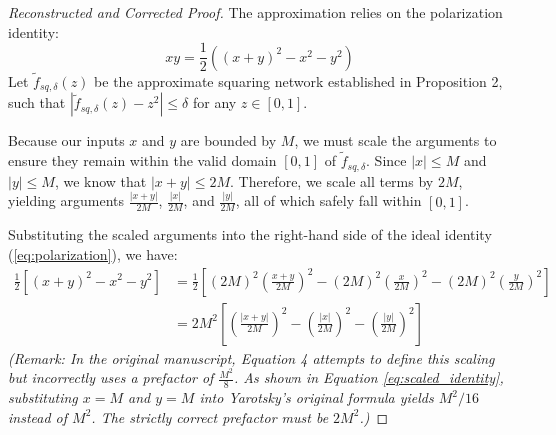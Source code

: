 \documentclass[12pt]{article}
\begin{document}
\begin{proof}[Reconstructed and Corrected Proof]
The approximation relies on the polarization identity:
\begin{equation}
xy = \frac{1}{2} \left( (x+y)^2 - x^2 - y^2 \right) \label{eq:polarization}
\end{equation}
Let $\tilde{f}_{sq, \delta}(z)$ be the approximate squaring network established in Proposition 2, such that $|\tilde{f}_{sq, \delta}(z) - z^2| \le \delta$ for any $z \in [0,1]$. 

Because our inputs $x$ and $y$ are bounded by $M$, we must scale the arguments to ensure they remain within the valid domain $[0,1]$ of $\tilde{f}_{sq, \delta}$. Since $|x| \le M$ and $|y| \le M$, we know that $|x+y| \le 2M$. Therefore, we scale all terms by $2M$, yielding arguments $\frac{|x+y|}{2M}$, $\frac{|x|}{2M}$, and $\frac{|y|}{2M}$, all of which safely fall within $[0,1]$.

Substituting the scaled arguments into the right-hand side of the ideal identity (\ref{eq:polarization}), we have:
\begin{align}
\frac{1}{2} \left[ (x+y)^2 - x^2 - y^2 \right] &= \frac{1}{2} \left[ (2M)^2 \left(\frac{x+y}{2M}\right)^2 - (2M)^2 \left(\frac{x}{2M}\right)^2 - (2M)^2 \left(\frac{y}{2M}\right)^2 \right] \nonumber \\
&= 2M^2 \left[ \left(\frac{|x+y|}{2M}\right)^2 - \left(\frac{|x|}{2M}\right)^2 - \left(\frac{|y|}{2M}\right)^2 \right] \label{eq:scaled_identity}
\end{align}
\textit{(Remark: In the original manuscript, Equation 4 attempts to define this scaling but incorrectly uses a prefactor of $\frac{M^2}{8}$. As shown in Equation \ref{eq:scaled_identity}, substituting $x=M$ and $y=M$ into Yarotsky's original formula yields $M^2/16$ instead of $M^2$. The strictly correct prefactor must be $2M^2$.)}


\end{proof}
\end{document}
